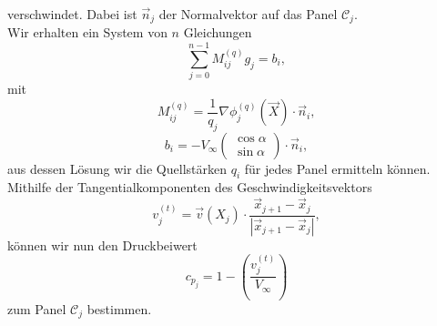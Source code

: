 verschwindet. Dabei ist $\vec n_j$ der Normalvektor auf das Panel $\mathcal{C}_j$.\\
Wir erhalten ein System von $n$ Gleichungen
\begin{equation}
\sum_{j=0}^{n-1} M_{ij}^{(q)}g_j =  b_i,
\end{equation}
mit
\begin{equation}
M_{ij}^{(q)} = \frac{1}{q_j} \nabla \phi_j^{(q)} (\vec X) \cdot \vec n_i,
\end{equation}
\begin{equation}
b_i =  -V_{\infty} \left( \begin{matrix} \cos \alpha \\ \sin \alpha \end{matrix} \right) \cdot \vec n_i,
\end{equation}
aus dessen Lösung wir die Quellstärken $q_i$ für jedes Panel ermitteln können. \\
Mithilfe der Tangentialkomponenten des Geschwindigkeitsvektors
\begin{equation}
\label{eqn:vt}
v_j^{(t)} =  \vec v(X_j) \cdot \frac{\vec x_{j+1}-\vec x_j}{|\vec x_{j+1}-\vec x_j|},
\end{equation}
können wir nun den Druckbeiwert
\begin{equation}
c_{p_j} =  1 - \left( \frac{v_j^{(t)}}{V_{\infty}}\right)
\end{equation}
zum Panel $\mathcal{C}_j$ bestimmen.

